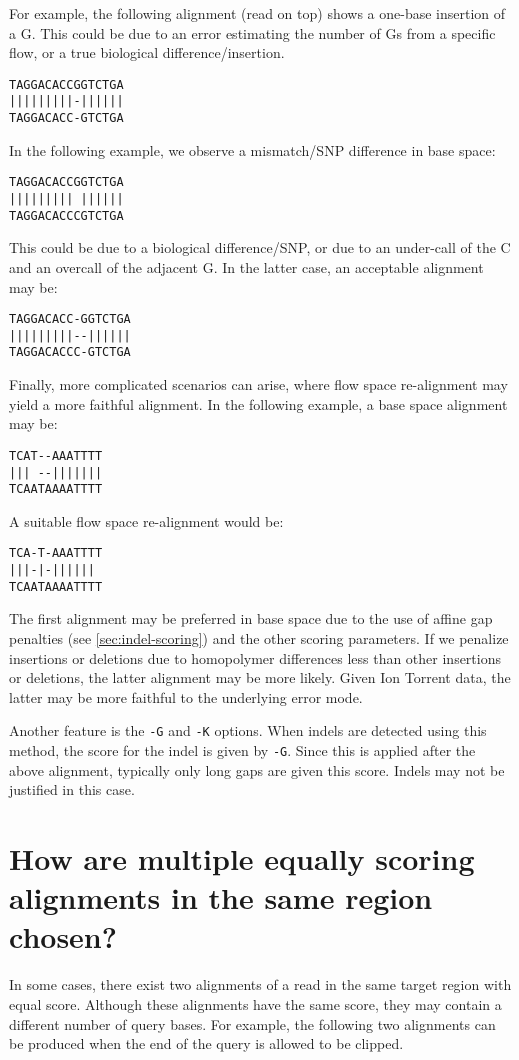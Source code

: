 \documentclass[a4paper,12pt]{book}
\newcommand{\TT}[1]{{\tt #1}} %
\begin{document}
For example, the following alignment (read on top) shows a one-base insertion of a G.
This could be due to an error estimating the number of Gs from a specific flow, or a true biological difference/insertion.
\begin{verbatim}
TAGGACACCGGTCTGA
|||||||||-||||||
TAGGACACC-GTCTGA
\end{verbatim}

In the following example, we observe a mismatch/SNP difference in base space:
\begin{verbatim}
TAGGACACCGGTCTGA
||||||||| ||||||
TAGGACACCCGTCTGA
\end{verbatim}
This could be due to a biological difference/SNP, or due to an under-call of the C and an overcall of the adjacent G.
In the latter case, an acceptable alignment may be:
\begin{verbatim}
TAGGACACC-GGTCTGA
|||||||||--||||||
TAGGACACCC-GTCTGA
\end{verbatim}

Finally, more complicated scenarios can arise, where flow space re-alignment may yield a more faithful alignment.
In the following example, a base space alignment may be:
\begin{verbatim}
TCAT--AAATTTT
||| --|||||||
TCAATAAAATTTT
\end{verbatim}
A suitable flow space re-alignment would be:
\begin{verbatim}
TCA-T-AAATTTT
|||-|-||||||
TCAATAAAATTTT
\end{verbatim}
The first alignment may be preferred in base space due to the use of affine gap penalties (see \autoref{sec:indel-scoring}) and the other scoring parameters.
If we penalize insertions or deletions due to homopolymer differences less than other insertions or deletions, the latter alignment may be more likely.
Given Ion Torrent data, the latter may be more faithful to the underlying error mode.

Another feature is the \TT{-G} and \TT{-K} options.
When indels are detected using this method, the score for the indel is given by \TT{-G}.
Since this is applied after the above alignment, typically only long gaps are given this score.
Indels may not be justified in this case.

\section{How are multiple equally scoring alignments in the same region chosen?}

In some cases, there exist two alignments of a read in the same target region with equal score. 
Although these alignments have the same score, they may contain a different number of query bases.
For example, the following two alignments can be produced when the end of the query is allowed to be clipped. 
\end{document}

